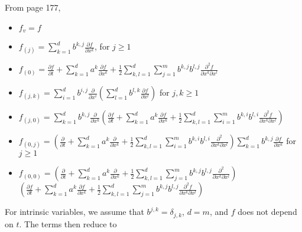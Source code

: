 \documentclass[12pt]{article}
\begin{document}
From page 177,
\begin{itemize}
\item $f_v = f$
\item $f_{(j)} = \sum_{k=1}^d b^{k,j} \frac{\partial f}{\partial x^k}$, for $j \ge 1$
\item $f_{(0)} = \frac{\partial f}{\partial t} + \sum_{k=1}^d a^k \frac{\partial f}{\partial x^k} + \frac{1}{2} \sum_{k,l=1}^d \sum_{j=1}^m b^{k,j} b^{l,j} \frac{\partial^2 f}{\partial x^k \partial x^l}$
\item $f_{(j, k)} = \sum_{i=1}^d b^{i,j} \frac{\partial }{\partial x^i} \left( \sum_{l=1}^d b^{l,k} \frac{\partial f}{\partial x^l} \right) $ for $j,k \ge 1$
\item $f_{(j,0)} = \sum_{k=1}^d b^{k,j} \frac{\partial }{\partial x^k} \left( \frac{\partial f}{\partial t} + \sum_{k=1}^d a^k \frac{\partial f}{\partial x^k} + \frac{1}{2} \sum_{k,l=1}^d \sum_{i=1}^m b^{k,i} b^{l,i} \frac{\partial^2 f}{\partial x^k \partial x^l} \right)$
\item $f_{(0, j)} = \left( \frac{\partial}{\partial t} + \sum_{k=1}^d a^k \frac{\partial}{\partial x^k} + \frac{1}{2} \sum_{k,l=1}^d \sum_{i=1}^m b^{k,i} b^{l,i} \frac{\partial^2}{\partial x^k \partial x^l} \right)  \sum_{k=1}^d b^{k,j} \frac{\partial f}{\partial x^k}$ for $j \ge 1$
\item $f_{(0,0)} = \left( \frac{\partial}{\partial t} + \sum_{k=1}^d a^k \frac{\partial}{\partial x^k} + \frac{1}{2} \sum_{k,l=1}^d \sum_{j=1}^m b^{k,j} b^{l,j} \frac{\partial^2}{\partial x^k \partial x^l} \right) $\\ $ \left( \frac{\partial f}{\partial t} + \sum_{k=1}^d a^k \frac{\partial f}{\partial x^k} + \frac{1}{2} \sum_{k,l=1}^d \sum_{j=1}^m b^{k,j} b^{l,j} \frac{\partial^2 f}{\partial x^k \partial x^l} \right)$
\end{itemize}
%
For intrinsic variables, we assume that $b^{j,k} = \delta_{j,k}$, $d=m$, and $f$ does not depend on $t$. 
%
The terms then reduce to
\end{document}
